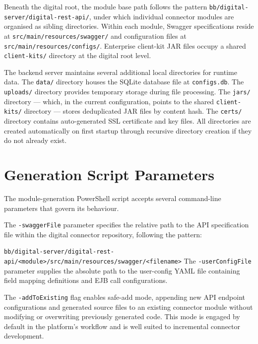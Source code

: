Beneath the digital root, the module base path follows the pattern \texttt{bb/\allowbreak digital-server/\allowbreak digital-rest-api/}, under which individual connector modules are organised as sibling directories. Within each module, Swagger specifications reside at \texttt{src/\allowbreak main/\allowbreak resources/\allowbreak swagger/} and configuration files at \texttt{src/\allowbreak main/\allowbreak resources/\allowbreak configs/}. Enterprise client-kit JAR files occupy a shared \texttt{client-kits/} directory at the digital root level.

The backend server maintains several additional local directories for runtime data. The \texttt{data/} directory houses the SQLite database file at \texttt{configs.db}. The \texttt{uploads/} directory provides temporary storage during file processing. The \texttt{jars/} directory --- which, in the current configuration, points to the shared \texttt{client-kits/} directory --- stores deduplicated JAR files by content hash. The \texttt{certs/} directory contains auto-generated SSL certificate and key files. All directories are created automatically on first startup through recursive directory creation if they do not already exist.

\section{Generation Script Parameters}

The module-generation PowerShell script accepts several command-line parameters that govern its behaviour.

The \texttt{-swaggerFile} parameter specifies the relative path to the API specification file within the digital connector repository, following the pattern:

\smallskip
\noindent\texttt{bb/\allowbreak digital-server/\allowbreak digital-rest-api/\allowbreak <module>/\allowbreak src/\allowbreak main/\allowbreak resources/\allowbreak swagger/\allowbreak <filename>}
\smallskip The \texttt{-userConfigFile} parameter supplies the absolute path to the user-config YAML file containing field mapping definitions and EJB call configurations.

The \texttt{-addToExisting} flag enables safe-add mode, appending new API endpoint configurations and generated source files to an existing connector module without modifying or overwriting previously generated code. This mode is engaged by default in the platform's workflow and is well suited to incremental connector development.

